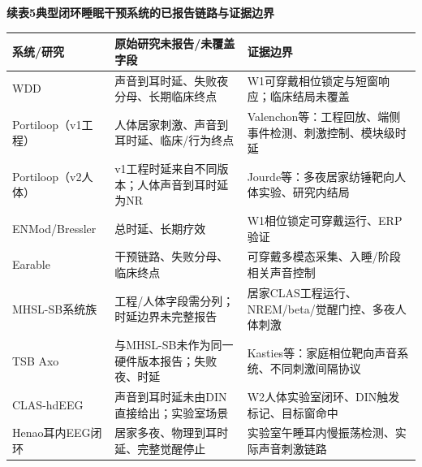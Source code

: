 \documentclass[UTF8,zihao=5,fontset=none]{ctexart}
\begin{document}
\begin{center}
\begin{minipage}{\textwidth}
\centering

\fontsize{7.2pt}{8.6pt}\selectfont

\setlength{\tabcolsep}{1.8pt}

\vspace{2pt}

{\bfseries 续表5\quad 典型闭环睡眠干预系统的已报告链路与证据边界}\par

\vspace{2pt}

\begin{tabularx}{\textwidth}{>{\raggedright\arraybackslash}p{}>{\raggedright\arraybackslash}X>{\raggedright\arraybackslash}X}

\hline

系统/研究 & 原始研究未报告/未覆盖字段 & 证据边界 \\

\hline

WDD & 声音到耳时延、失败夜分母、长期临床终点 & W1可穿戴相位锁定与短窗响应；临床结局未覆盖 \\

Portiloop（v1工程） & 人体居家刺激、声音到耳时延、临床/行为终点 & Valenchon等：工程回放、端侧事件检测、刺激控制、模块级时延 \\

Portiloop（v2人体） & v1工程时延来自不同版本；人体声音到耳时延为NR & Jourde等：多夜居家纺锤靶向人体实验、研究内结局 \\

ENMod/Bressler & 总时延、长期疗效 & W1相位锁定可穿戴运行、ERP验证 \\

Earable & 干预链路、失败分母、临床终点 & 可穿戴多模态采集、入睡/阶段相关声音控制 \\

MHSL-SB系统族 & 工程/人体字段需分列；时延边界未完整报告 & 居家CLAS工程运行、NREM/beta/觉醒门控、多夜人体刺激 \\

TSB Axo & 与MHSL-SB未作为同一硬件版本报告；失败夜、时延 & Kasties等：家庭相位靶向声音系统、不同刺激间隔协议 \\

CLAS-hdEEG & 声音到耳时延未由DIN直接给出；实验室场景 & W2人体实验室闭环、DIN触发标记、目标窗命中 \\

Henao耳内EEG闭环 & 居家多夜、物理到耳时延、完整觉醒停止 & 实验室午睡耳内慢振荡检测、实际声音刺激链路 \\


\end{tabularx}
\end{minipage}
\end{center}
\end{document}
